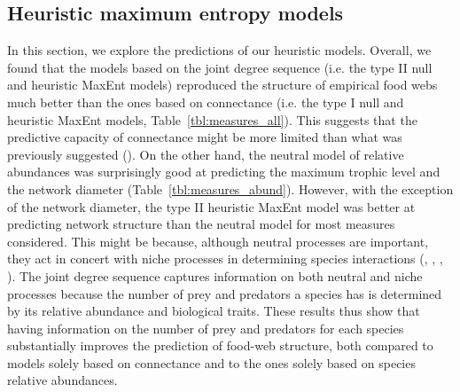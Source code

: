 \subsection{Heuristic maximum entropy models}

In this section, we explore the predictions of our heuristic models. Overall, we
found that the models based on the joint degree sequence (i.e. the type II null
and heuristic MaxEnt models) reproduced the structure of empirical food webs
much better than the ones based on connectance (i.e. the type I null and
heuristic MaxEnt models, Table~\ref{tbl:measures_all}). This suggests that the
predictive capacity of connectance might be more limited than what was
previously suggested (\cite{Poisot2014When}). On the other hand, the neutral
model of relative abundances was surprisingly good at predicting the maximum
trophic level and the network diameter (Table~\ref{tbl:measures_abund}). However,
with the exception of the network diameter, the type II heuristic MaxEnt model
was better at predicting network structure than the neutral model for most
measures considered. This might be because, although neutral processes are
important, they act in concert with niche processes in determining species
interactions (\cite{Bartomeus2016Common}, \cite{Canard2014Empirical},
\cite{Poisot2015Species}, \cite{Pomeranz2019Inferring}). The joint degree sequence
captures information on both neutral and niche processes because the number of
prey and predators a species has is determined by its relative abundance and
biological traits. These results thus show that having information on the number
of prey and predators for each species substantially improves the prediction of
food-web structure, both compared to models solely based on connectance and to
the ones solely based on species relative abundances.

